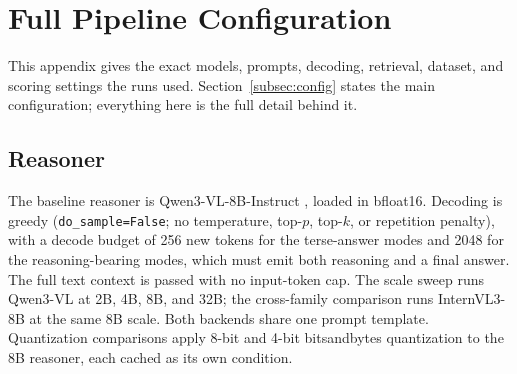 \setcounter{topnumber}{4}
\setcounter{bottomnumber}{3}
\setcounter{totalnumber}{6}
\setcounter{dbltopnumber}{4}
\renewcommand{\topfraction}{0.95}
\renewcommand{\bottomfraction}{0.95}
\renewcommand{\dbltopfraction}{0.95}
\renewcommand{\textfraction}{0.05}
\renewcommand{\floatpagefraction}{0.85}
\renewcommand{\dblfloatpagefraction}{0.85}

\newpage
\section{Full Pipeline Configuration}
\label{app:config}

This appendix gives the exact models, prompts, decoding, retrieval, dataset, and scoring settings the runs used. Section~\ref{subsec:config} states the main configuration; everything here is the full detail behind it.

\subsection{Reasoner}
\label{app:cfg_reasoner}
The baseline reasoner is Qwen3-VL-8B-Instruct \cite{bai2025qwen3vl}, loaded in bfloat16. Decoding is greedy (\texttt{do\_sample=False}; no temperature, top-$p$, top-$k$, or repetition penalty), with a decode budget of 256 new tokens for the terse-answer modes and 2048 for the reasoning-bearing modes, which must emit both reasoning and a final answer. The full text context is passed with no input-token cap. The scale sweep runs Qwen3-VL at 2B, 4B, 8B, and 32B; the cross-family comparison runs InternVL3-8B \cite{zhu2025internvl3} at the same 8B scale. Both backends share one prompt template. Quantization comparisons apply 8-bit and 4-bit bitsandbytes quantization to the 8B reasoner, each cached as its own condition.

